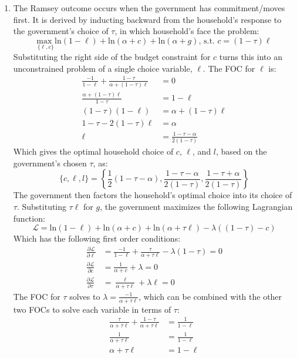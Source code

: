 \documentclass{article}
\newcommand{\loge}[1]{\text{ln}\left(#1\right)}
\newcommand{\usmax}[1]{\underset{\{#1\}}{\text{max }}}
\renewcommand{\L}{\mathcal{L}}
\begin{document}
\begin{enumerate}
	\item The Ramsey outcome occurs when the government has commitment/moves first. It is derived by inducting backward from the household's response to the government's choice of $\tau$, in which household's face the problem:
		\[
			\usmax{\ell,c}\loge{1-\ell} + \loge{\alpha + c} + \loge{\alpha + g}\text{, s.t. }c=(1-\tau)\ell
		\]
		Substituting the right side of the budget constraint for $c$ turns this into an unconstrained problem of a single choice variable, $\ell$. The FOC for $\ell$ is:
		\begin{align*}
			\frac{-1}{1-\ell} + \frac{1-\tau}{\alpha + (1-\tau)\ell}  &= 0	\\
			\frac{\alpha + (1-\tau)\ell}{1-\tau}&= 1-\ell  \\
			(1-\tau)(1-\ell) &= \alpha + (1-\tau)\ell \\
			1-\tau-2(1-\tau)\ell &= \alpha \\
			\ell &= \frac{1-\tau-\alpha}{2(1-\tau)}
		\end{align*}
		Which gives the optimal household choice of $c$, $\ell$, and $l$, based on the government's chosen $\tau$, as:
		\[
			\{c,\ell,l\} = \left\{\frac{1}{2}\left(1-\tau-\alpha\right),\frac{1-\tau-\alpha}{2(1-\tau)},\frac{1-\tau+\alpha}{2(1-\tau)} \right\}
		\]
		The government then factors the household's optimal choice into its choice of $\tau$. Substituting $\tau\ell$ for $g$, the government maximizes the following Lagrangian function:
		\[
			\L = \loge{1-\ell}+\loge{\alpha+c} + \loge{\alpha + \tau\ell} - \lambda((1-\tau)-c)
		\]
		Which has the following first order conditions:
		\begin{align*}
			\frac{\partial\L}{\partial\ell} &= \frac{-1}{1-\ell} + \frac{\tau}{\alpha+\tau\ell} - \lambda(1-\tau) = 0	\\
			\frac{\partial\L}{\partial c} 	&= \frac{1}{\alpha+c} + \lambda = 0	\\
			\frac{\partial\L}{\partial\tau} &= \frac{\ell}{\alpha+\tau\ell} + \lambda\ell = 0
		\end{align*}
		The FOC for $\tau$ solves to $\lambda=\frac{-1}{\alpha+\tau\ell}$, which can be combined with the other two FOCs to solve each variable in terms of $\tau$:
		\begin{align*}
			 \frac{\tau}{\alpha+\tau\ell} + \frac{1-\tau}{\alpha+\tau\ell} &= \frac{1}{1-\ell}	\\
			\frac{1}{\alpha+\tau\ell} &= \frac{1}{1-\ell}	\\
			\alpha+\tau\ell &= 1-\ell	\\

\end{align*}
\end{enumerate}
\end{document}
